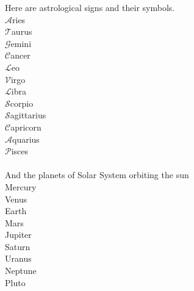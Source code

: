 \documentclass[]{article}
\begin{document}
Here are astrological signs and their symbols.\\
{\centering
$\mathcal{A}$ries \Aries \\ $\mathcal{T}$aurus \Taurus\\
$\mathcal{G}$emini \Gemini\\$\mathcal{C}$ancer \Cancer \\ $\mathcal{L}$eo \Leo \\
$\mathcal{V}$irgo \Virgo \\ $\mathcal{L}$ibra \Libra \\ $\mathcal{S}$corpio \Scorpio \\
$\mathcal{S}$agittarius \Sagittarius\\ $\mathcal{C}$apricorn \Capricorn\\
$\mathcal{A}$quarius \Aquarius \\ $\mathcal{P}$isces \Pisces\\} \\
\break
{\centering
And the planets of Solar System orbiting the sun \Sun\\
Mercury \Mercury\\ Venus \Venus \\ Earth \Earth \\ Mars \Mars \\ Jupiter \Jupiter \\
Saturn \Saturn \\ Uranus \Uranus \\ Neptune \Neptune \\ Pluto \Pluto \\
}
\end{document}
